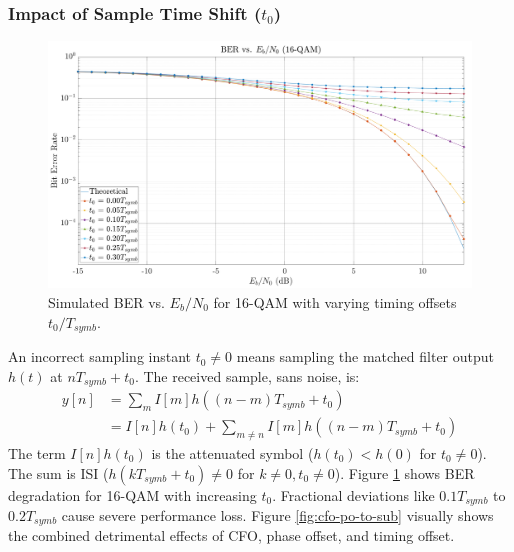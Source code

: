\documentclass[11pt]{article}
\begin{document}
	\subsubsection{Impact of Sample Time Shift ($t_0$)}
	\begin{figure}[H]
		\centering
		\includegraphics[width=0.8\linewidth]{Images/ber-timing}
		\caption{Simulated BER vs. $E_b/N_0$ for 16-QAM with varying timing offsets $t_0/T_{symb}$.}
		\label{fig:ber-timing}
	\end{figure}
	An incorrect sampling instant $t_0 \neq 0$ means sampling the matched filter output $h(t)$ at $nT_{symb} + t_0$. The received sample, sans noise, is:
	\begin{align}
		y[n] &= \sum_m I[m]h((n-m)T_{symb} + t_0) \\
		&= I[n]h(t_0) + \sum_{m \neq n} I[m]h((n-m)T_{symb} + t_0) \label{eq:timing_offset_impact_revised_style_change}
	\end{align}
	The term $I[n]h(t_0)$ is the attenuated symbol ($h(t_0) < h(0)$ for $t_0 \neq 0$). The sum is ISI ($h(kT_{symb} + t_0) \neq 0$ for $k \neq 0, t_0 \neq 0$). Figure \ref{fig:ber-timing} shows BER degradation for 16-QAM with increasing $t_0$. Fractional deviations like $0.1 T_{symb}$ to $0.2 T_{symb}$ cause severe performance loss. Figure \ref{fig:cfo-po-to-sub} visually shows the combined detrimental effects of CFO, phase offset, and timing offset.
	
\end{document}
